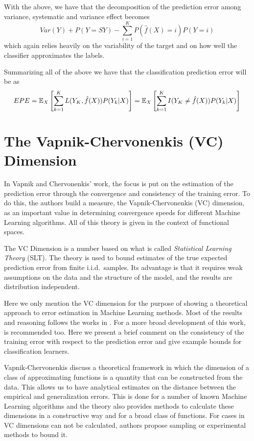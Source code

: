 \begin{appendices}
With the above, we have that the decomposition of the prediction error among variance, systematic and variance effect becomes
\begin{equation}
Var(Y) + P(Y=SY) - \sum_{i=1}^K P(\hat{f}(X) =i)P(Y=i)
\end{equation}
	 which again relies heavily on the variability of the target and on how well the classifier approximates the labels.


Summarizing all of the above we have that the classification prediction error will be as
\begin{equation}
EPE = \operatorname{\mathbb{E}}_X\left[ \sum_{k=1}^{K} L( Y_K , \hat{f}(X) ) P(Y_k|X) \right] =
\operatorname{\mathbb{E}}_X\left[ \sum_{k=1}^{K} I(Y _K\neq \hat{f}(X)) P(Y_k|X) \right]
\end{equation}\label{eq:classificationEPE}


\section{The Vapnik-Chervonenkis (VC) Dimension }\label{appx:sec:vcDimension}

In Vapnik and Chervonenkis' work, the focus is put on the estimation of the prediction error through the convergence and consistency of the training error.
To do this, the authors build a measure, the Vapnik-Chervonenkis (VC) dimension, as an important value in determining convergence speeds for different Machine Learning algorithms.
All of this theory is given in the context of functional spaces.

The VC Dimension is a number based on what is called \textit{Statistical Learning Theory} (SLT).
The theory is used to bound estimates of the true expected prediction error from finite i.i.d.\ samples.
Its advantage is that it requires weak assumptions on the data and the structure of the model, and the results are distribution independent.

Here we only mention the VC dimension for the purpose of showing a theoretical approach to error estimation in Machine Learning methods.
Most of the results and reasoning follows the works in \citep{cherkassky-learning2007}.
For a more broad development of this work, \citep{vapnik-nature2000} is recommended too.
Here we present a brief comment on the consistency of the training error with respect to the prediction error and give example bounds for classification learners.


Vapnik-Chervonenkis discuss a theoretical framework in which the dimension of a class of approximating functions is a quantity that can be constructed from the data.
This allows us to have analytical estimates on the distance between the empirical and generalization errors.
This is done for a number of known Machine Learning algorithms and the theory also provides methods to calculate these dimensions in a constructive way and for a broad class of functions.
For cases in VC dimensions can not be calculated, authors propose sampling or experimental methods to bound it.


\end{appendices}
